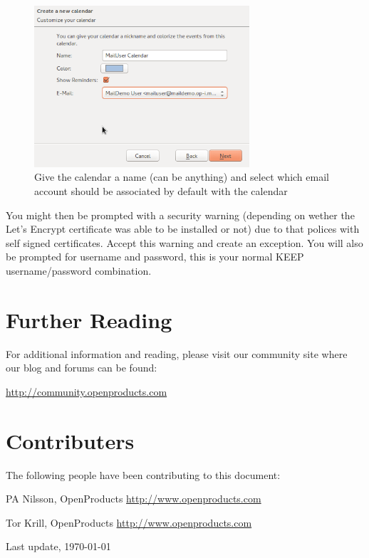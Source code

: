 \documentclass[12pt,a4paper,titlepage]{article}
\begin{document}
\begin{figure}[h!]
\centering
\includegraphics[width=8cm]{./img/External-clients-lightning3.png}
\caption{Give the calendar a name (can be anything) and select which email account should be associated by default with the calendar}
\end{figure}
\FloatBarrier
You might then be prompted with a security warning (depending on wether the Let's Encrypt certificate was able to be installed or not) due to that polices with self signed certificates. Accept this warning and create an exception. You will also be prompted for username and password, this is your normal KEEP username/password combination.

\newpage
\section{Further Reading}
For additional information and reading, please visit our community site where our blog and forums can be found:

\href{http://community.openproducts.com}{http://community.openproducts.com}
\newpage
\section{Contributers}
The following people have been contributing to this document:
\begin{description}
\item PA Nilsson, OpenProducts \href{http://www.openproducts.com}{http://www.openproducts.com}
\item Tor Krill, OpenProducts \href{http://www.openproducts.com}{http://www.openproducts.com}
\end{description}
Last update, \today
\end{document}
